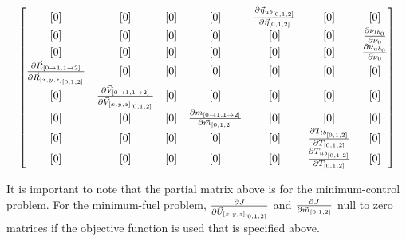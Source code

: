 \begin{equation}
\begin{bmatrix}
[0] &
[0] &
[0] &
[0] &
\pdv{\vec{\eta}_{ub_{[0,1,2]}}}{\vec{\eta}_{[0,1,2]}} &
[0] &
[0]  \\

[0] &
[0] &
[0] &
[0] &
[0] &
[0] &
\pdv{\nu_{lb_0}}{\nu_0} \\

[0] &
[0] &
[0] &
[0] &
[0] &
[0] &
\pdv{\nu_{ub_0}}{\nu_0} \\

\pdv{\vec{R}_{[0 \rightarrow 1, 1 \rightarrow 2]}}{\vec{R}_{[x,y,z]_{[0,1,2]}}} &
[0] &
[0] &
[0] &
[0] &
[0] &
[0]  \\

[0] &
\pdv{\vec{V}_{[0 \rightarrow 1, 1 \rightarrow 2]}}{\vec{V}_{[x,y,z]_{[0,1,2]}}} &
[0] &
[0] &
[0] &
[0] &
[0]  \\

[0] &
[0] &
[0] &
\pdv{m_{[0 \rightarrow 1, 1 \rightarrow 2]}}{\vec{m}_{[0,1,2]}} &
[0] &
[0] &
[0]  \\

[0] &
[0] &
[0] &
[0] &
[0] &
\pdv{T_{lb_{[0,1,2]}}}{T_{[0,1,2]}} &
[0]  \\

[0] &
[0] &
[0] &
[0] &
[0] &
\pdv{T_{ub_{[0,1,2]}}}{T_{[0,1,2]}} &
[0]  \\
\end{bmatrix}
\end{equation}

It is important to note that the partial matrix above is for the minimum-control problem. For the minimum-fuel problem, $\pdv{J}{\vec{U}_{[x,y,z]_{[0,1,2]}}}$ and $\pdv{J}{\vec{m}_{[0,1,2]}}$ null to zero matrices if the objective function is used that is specified above.

